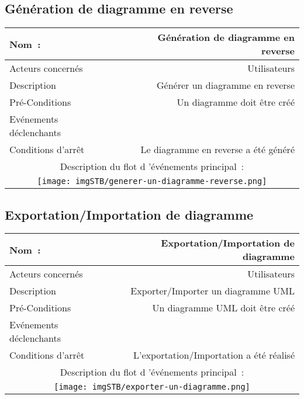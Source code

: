 \documentclass[hidelinks, 10pt,a4paper]{article}
\begin{document}
\subsection{Génération de diagramme en reverse}
\begin{center}
    \begin{tabular}{|l|r|}
        \hline{\textbf{Nom~:}} & {\textbf{Génération de diagramme en reverse}} \\\hline
        {Acteurs concernés} & {Utilisateurs} \\\hline
        {Description} & {Générer un diagramme en reverse} \\\hline
        {Pré-Conditions} & {Un diagramme doit être créé} \\\hline
        {Evénements déclenchants} & {} \\\hline
        {Conditions d’arrêt} & {Le diagramme en reverse a été généré} \\\hline
        \multicolumn{2}{|c|}{Description du flot d ’événements principal~:} \\\hline
        \multicolumn{2}{|c|}{\texttt{[image: imgSTB/generer-un-diagramme-reverse.png]}} \\\hline
    \end{tabular}
\end{center}

\subsection{Exportation/Importation de diagramme}
\begin{center}
    \begin{tabular}{|l|r|}
        \hline{\textbf{Nom~:}} & {\textbf{Exportation/Importation de diagramme}} \\\hline
        {Acteurs concernés} & {Utilisateurs} \\\hline
        {Description} & {Exporter/Importer un diagramme UML} \\\hline
        {Pré-Conditions} & {Un diagramme UML doit être créé} \\\hline
        {Evénements déclenchants} & {} \\\hline
        {Conditions d’arrêt} & {L'exportation/Importation a été réalisé} \\\hline
        \multicolumn{2}{|c|}{Description du flot d ’événements principal~:} \\\hline
        \multicolumn{2}{|c|}{\texttt{[image: imgSTB/exporter-un-diagramme.png]}} \\\hline
    \end{tabular}
\end{center}
\newpage
\end{document}
